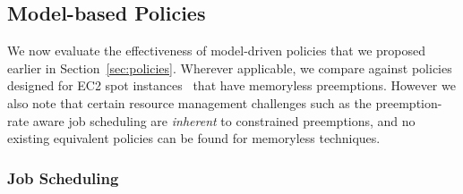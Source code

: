 \vspace*{\subsecspace}
\subsection{Model-based Policies}
\label{subsec:eval-policy}

We now evaluate the effectiveness of model-driven policies that we proposed earlier in Section~\ref{sec:policies}.
%
Wherever applicable, we compare against policies designed for EC2 spot instances~\cite{harlap2018tributary, spoton} that have memoryless preemptions. 
%
However we also note that certain resource management challenges such as the preemption-rate aware job scheduling are \emph{inherent} to constrained preemptions, and no existing equivalent policies can be found for memoryless techniques. 




\vspace*{\subsecspace}
\subsubsection{Job Scheduling}

